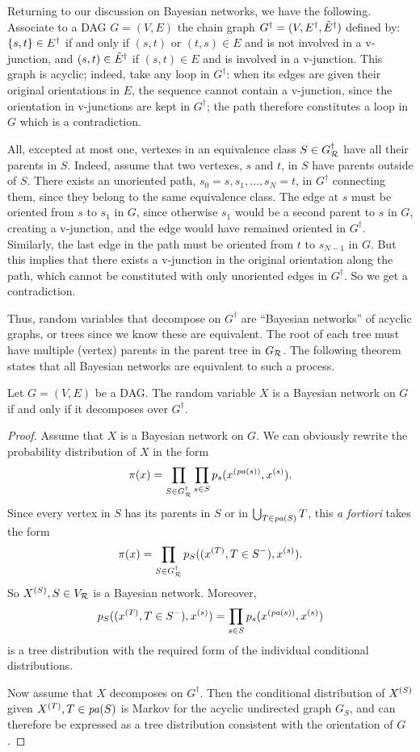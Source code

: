 Returning to our discussion on Bayesian networks, we have the
following.  Associate to a DAG $G = (V,E)$ the chain graph
$G^\dagger = (V, E^\dagger, {\tilde{E}}^\dagger)$ defined by: $\left\{ s,t \right\}\in
E^\dagger$ if and only if $(s,t)$ or $(t,s)\in E$ and is not involved
in a v-junction, and $(s,t)\in {\tilde{E}}^\dagger$ if $(s,t)\in E$ and is
involved in a v-junction. This graph is acyclic; indeed, take any loop
in $G^\dagger$: when its edges are given their original 
orientations in $E$, the sequence cannot contain a v-junction, since
the orientation in v-junctions are kept in $G^\dagger$; the path therefore
constitutes a loop in $G$ which is a contradiction. 

All, excepted at most one, vertexes in an
equivalence class $S\in G^\dagger_{\mathcal R}$ have all their parents in
$S$. Indeed, assume that two vertexes,  $s$ and $t$, in $S$ have
parents outside of
$S$. There exists an unoriented path, $s_0=s, s_1, \ldots, s_N = t$,
in $G^\dagger$ connecting them,  since they belong to the same
equivalence class. The edge
at $s$ must be oriented from $s$ to $s_1$ in $G$, since otherwise
$s_1$ would be a second parent to $s$ in $G$, creating a v-junction,
and the edge would have remained
oriented in $G^\dagger$. Similarly, the last edge in the path must be oriented from $t$ to
$s_{N-1}$ in $G$. But this implies that there exists a v-junction in
the original orientation along the path, which cannot be constituted
with only unoriented edges in $G^\dagger$. So we get a contradiction.

Thus,  random variables that decompose on $G^\dagger$ are ``Bayesian
networks'' of acyclic graphs, or trees since we know these are
equivalent. The root of each tree must have multiple (vertex) parents
in the parent tree in $G_{\mathcal R}$. The following theorem states that
all Bayesian networks are equivalent to such a process.

\begin{theorem}
\label{th:acg}
Let $G = (V,E)$ be a DAG. The random variable $X$ is a Bayesian network on
$G$ if and only if it decomposes over $G^\dagger$.
\end{theorem}
\begin{proof}
Assume that $X$ is a Bayesian network on $G$. We can obviously rewrite the
probability distribution of $X$ in the form
$$
\pi(x) = \prod_{S\in G^\dagger_{\mathcal R}}\prod_{s\in S} p_s(x^{({\mathit{pa}(s)})}, x^{(s)}).
$$
Since every vertex in $S$ has its parents in $S$ or in $\bigcup_{T\in {\mathit{pa}(S)}} T$,
this {\em a fortiori} takes the form
$$
\pi(x) = \prod_{S\in G^\dagger_{\mathcal R}} p_S((x^{(T)}, T\in S^{-}), x^{(s)} ).
$$
So $X^{(S)}, S\in V_{\mathcal R}$ is a Bayesian network. Moreover, 
$$
p_S((x^{(T)}, T\in S^{-}), x^{(s)} ) = \prod_{s\in S} p_s(x^{({\mathit{pa}(s)})}, x^{(s)})
$$
is a tree distribution with the required form of the individual
conditional distributions. 

Now assume that $X$ decomposes on $G^\dagger$. Then the conditional
distribution of $X^{(S)}$ given $X^{(T)}, T\in {\mathit{pa}(S)}$ is Markov for the acyclic
undirected graph $G_S$, and can therefore be expressed as a tree
distribution consistent with the orientation of $G$. 
\end{proof}

